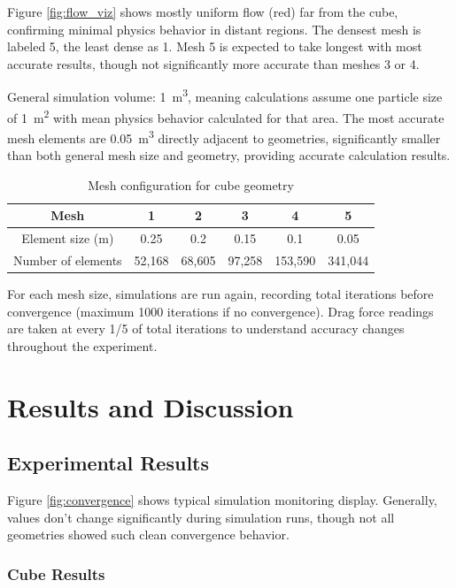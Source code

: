 \documentclass[12pt,a4paper]{article}
\begin{document}
Figure \ref{fig:flow_viz} shows mostly uniform flow (red) far from the cube, confirming minimal physics behavior in distant regions. The densest mesh is labeled 5, the least dense as 1. Mesh 5 is expected to take longest with most accurate results, though not significantly more accurate than meshes 3 or 4.

General simulation volume: \SI{1}{\meter\cubed}, meaning calculations assume one particle size of \SI{1}{\meter\squared} with mean physics behavior calculated for that area. The most accurate mesh elements are \SI{0.05}{\meter\cubed} directly adjacent to geometries, significantly smaller than both general mesh size and geometry, providing accurate calculation results.

\begin{table}[H]
\centering
\caption{Mesh configuration for cube geometry}
\label{tab:mesh_config}
\begin{tabular}{|c|c|c|c|c|c|}
\hline
\rowcolor{red!50}
\textbf{Mesh} & \textbf{1} & \textbf{2} & \textbf{3} & \textbf{4} & \textbf{5} \\
\hline
\rowcolor{red!50}
Element size (m) & 0.25 & 0.2 & 0.15 & 0.1 & 0.05 \\
\hline
\rowcolor{red!50}
Number of elements & 52,168 & 68,605 & 97,258 & 153,590 & 341,044 \\
\hline
\end{tabular}
\end{table}

For each mesh size, simulations are run again, recording total iterations before convergence (maximum 1000 iterations if no convergence). Drag force readings are taken at every 1/5 of total iterations to understand accuracy changes throughout the experiment.

\section{Results and Discussion}

\subsection{Experimental Results}

Figure \ref{fig:convergence} shows typical simulation monitoring display. Generally, values don't change significantly during simulation runs, though not all geometries showed such clean convergence behavior.

\subsubsection{Cube Results}
\end{document}
